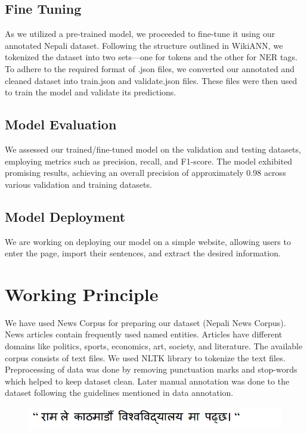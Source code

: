 \subsection{Fine Tuning}
As we utilized a pre-trained model, we proceeded to fine-tune it using our annotated Nepali dataset. Following the structure outlined in WikiANN, we tokenized the dataset into two sets—one for tokens and the other for NER tags. To adhere to the required format of .json files, we converted our annotated and cleaned dataset into train.json and validate.json files. These files were then used to train the model and validate its predictions.

\subsection{Model Evaluation}
We assessed our trained/fine-tuned model on the validation and testing datasets, employing metrics such as precision, recall, and F1-score. The model exhibited promising results, achieving an overall precision of approximately 0.98 across various validation and training datasets.

\subsection{Model Deployment}
We are working on deploying our model on a simple website, allowing users to enter the page, import their sentences, and extract the desired information.

\newpage
\section{Working Principle}
\vspace{10pt} %
We have used News Corpus for preparing our dataset (Nepali News Corpus). News articles contain frequently used named entities. Articles have different domains like politics, sports, economics, art, society, and literature. The available corpus consists of text files. We used NLTK library to tokenize the text files. Preprocessing of data was done by removing punctuation marks and stop-words which helped to keep dataset clean. Later manual annotation was done to the dataset following the guidelines mentioned in data annotation.


 
\begin{figure}[H]
\centering
\includegraphics [scale=0.8]{img/workingPrinciple/ramle.png}

\end{figure}


